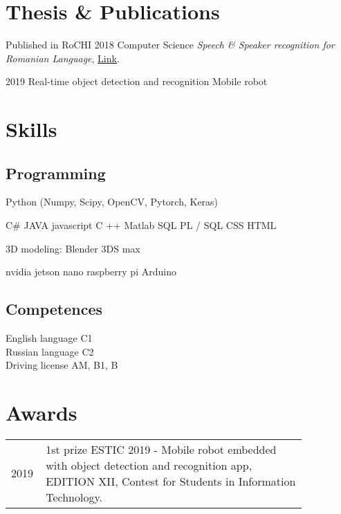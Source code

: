 \documentclass[]{deedy-resume-openfont}
\begin{document}
\begin{minipage}[t]{0.59\textwidth}
\section{Thesis \& Publications} 
\renewcommand\refname{\vskip -1.5cm} 


\textbullet{} Published in RoCHI 2018 \textbullet{} Computer Science  \textbullet{} \textit{Speech \& Speaker recognition for Romanian Language}, 
\href{https://www.semanticscholar.org/paper/Speech-%26-Speaker-recognition-for-Romanian-Language-Vezeteu-Sburlan/ef8aa0bd5d8109c5173a0b57fbba95243c704d3e}{Link}.
\sectionsep

\textbullet{} 2019 \textbullet{} Real-time object detection and recognition \textbullet{} Mobile robot


\section{Skills}
\subsection{Programming}
Python (Numpy, Scipy, OpenCV, Pytorch, Keras)

\sectionsep
{}
C\# \textbullet{} JAVA \textbullet{} javascript \textbullet{}
C ++ \textbullet{} Matlab \textbullet{} SQL \textbullet{} PL / SQL \textbullet{} CSS \textbullet{} HTML

\sectionsep
{}
3D modeling: \textbullet{}Blender \textbullet{}3DS max

\sectionsep
{}
\textbullet{} nvidia jetson nano \textbullet{}raspberry pi \textbullet{}Arduino

\sectionsep
\subsection{Competences}
\textbullet{} English language C1\\
\textbullet{} Russian language C2 \\
\textbullet{} Driving license AM, B1, B

\sectionsep


\section{Awards} 
\begin{tabular}{p{0.05\linewidth}p{0.8\linewidth}}
2019  &  1st prize ESTIC 2019 - Mobile robot embedded with object detection and recognition app, EDITION  XII, Contest for Students in Information Technology. \\


\end{tabular}
\end{minipage}
\end{document}
